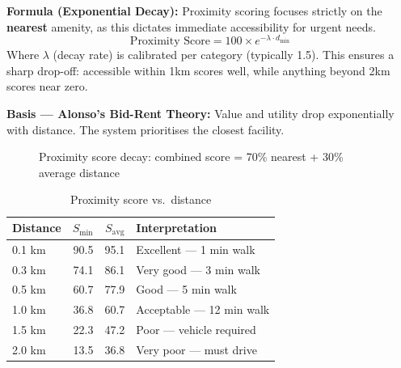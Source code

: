 \documentclass[11pt,a4paper]{article}
\begin{document}
\textbf{Formula (Exponential Decay):}
Proximity scoring focuses strictly on the \textbf{nearest} amenity, as this dictates immediate accessibility for urgent needs.
\begin{equation}
\text{Proximity Score} = 100 \times e^{-\lambda \cdot d_{\min}}
\end{equation}
Where $\lambda$ (decay rate) is calibrated per category (typically 1.5). This ensures a sharp drop-off: accessible within 1km scores well, while anything beyond 2km scores near zero.

\textbf{Basis --- Alonso's Bid-Rent Theory:} Value and utility drop exponentially with distance. The system prioritises the closest facility.

\begin{figure}[H]
\centering
{}
\caption{Proximity score decay: combined score = 70\% nearest + 30\% average distance}
\end{figure}

\begin{table}[H]
\centering
\caption{Proximity score vs.\ distance}
\begin{tabular}{@{}lrrp{5.5cm}@{}}
\toprule
\textbf{Distance} & $S_{\min}$ & $S_{\text{avg}}$ & \textbf{Interpretation} \\ \midrule
0.1 km & 90.5 & 95.1 & Excellent --- 1 min walk \\
0.3 km & 74.1 & 86.1 & Very good --- 3 min walk \\
0.5 km & 60.7 & 77.9 & Good --- 5 min walk \\
1.0 km & 36.8 & 60.7 & Acceptable --- 12 min walk \\
1.5 km & 22.3 & 47.2 & Poor --- vehicle required \\
2.0 km & 13.5 & 36.8 & Very poor --- must drive \\ \bottomrule
\end{tabular}
\end{table}
\end{document}
